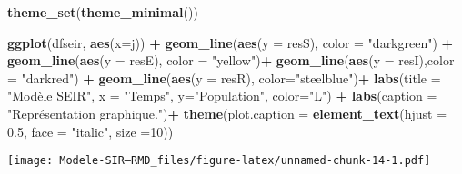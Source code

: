 \documentclass[
]{article}
\newenvironment{Shaded}{\begin{snugshade}}{\end{snugshade}}
\newcommand{\DataTypeTok}[1]{\textcolor[rgb]{0.13,0.29,0.53}{#1}}
\newcommand{\DecValTok}[1]{\textcolor[rgb]{0.00,0.00,0.81}{#1}}
\newcommand{\FloatTok}[1]{\textcolor[rgb]{0.00,0.00,0.81}{#1}}
\newcommand{\KeywordTok}[1]{\textcolor[rgb]{0.13,0.29,0.53}{\textbf{#1}}}
\newcommand{\NormalTok}[1]{#1}
\newcommand{\OperatorTok}[1]{\textcolor[rgb]{0.81,0.36,0.00}{\textbf{#1}}}
\newcommand{\StringTok}[1]{\textcolor[rgb]{0.31,0.60,0.02}{#1}}
\begin{document}
\begin{Shaded}
\begin{Highlighting}[]
\KeywordTok{theme_set}\NormalTok{(}\KeywordTok{theme_minimal}\NormalTok{())}

\KeywordTok{ggplot}\NormalTok{(dfseir, }\KeywordTok{aes}\NormalTok{(}\DataTypeTok{x=}\NormalTok{j)) }\OperatorTok{+}\StringTok{                                                    }\KeywordTok{geom_line}\NormalTok{(}\KeywordTok{aes}\NormalTok{(}\DataTypeTok{y =}\NormalTok{ resS), }\DataTypeTok{color =} \StringTok{"darkgreen"}\NormalTok{) }\OperatorTok{+}\StringTok{                         }\KeywordTok{geom_line}\NormalTok{(}\KeywordTok{aes}\NormalTok{(}\DataTypeTok{y =}\NormalTok{ resE), }\DataTypeTok{color =} \StringTok{"yellow"}\NormalTok{)}\OperatorTok{+}\StringTok{                             }\KeywordTok{geom_line}\NormalTok{(}\KeywordTok{aes}\NormalTok{(}\DataTypeTok{y =}\NormalTok{ resI),}\DataTypeTok{color =} \StringTok{"darkred"}\NormalTok{) }\OperatorTok{+}\StringTok{                           }\KeywordTok{geom_line}\NormalTok{(}\KeywordTok{aes}\NormalTok{(}\DataTypeTok{y =}\NormalTok{ resR), }\DataTypeTok{color=}\StringTok{"steelblue"}\NormalTok{)}\OperatorTok{+}\StringTok{                              }\KeywordTok{labs}\NormalTok{(}\DataTypeTok{title =} \StringTok{"Modèle SEIR"}\NormalTok{, }\DataTypeTok{x =} \StringTok{"Temps"}\NormalTok{, }\DataTypeTok{y=}\StringTok{"Population"}\NormalTok{, }\DataTypeTok{color=}\StringTok{"L"}\NormalTok{) }\OperatorTok{+}\StringTok{    }\KeywordTok{labs}\NormalTok{(}\DataTypeTok{caption =} \StringTok{"Représentation graphique."}\NormalTok{)}\OperatorTok{+}\StringTok{                            }\KeywordTok{theme}\NormalTok{(}\DataTypeTok{plot.caption =} \KeywordTok{element_text}\NormalTok{(}\DataTypeTok{hjust =} \FloatTok{0.5}\NormalTok{, }\DataTypeTok{face =} \StringTok{"italic"}\NormalTok{, }\DataTypeTok{size =}\DecValTok{10}\NormalTok{))}
\end{Highlighting}
\end{Shaded}

\texttt{[image: Modele-SIR---RMD\_files/figure-latex/unnamed-chunk-14-1.pdf]}
\end{document}
